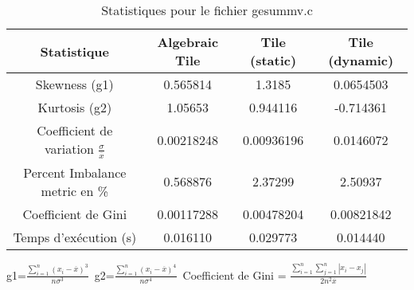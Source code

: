 \documentclass{article}
\begin{document}
\begin{table}[htbp]
  \centering
  \caption{Statistiques pour le fichier gesummv.c}
  \begin{tabular}{|c|c|c|c|}
    \hline
    Statistique & Algebraic Tile & Tile (static) & Tile (dynamic) \\ 
    \hline
    Skewness (g1)  & 0.565814 & 1.3185 & 0.0654503 \\ 
    Kurtosis (g2)  & 1.05653 & 0.944116 & -0.714361 \\ 
    Coefficient de variation $ \frac{\sigma}{\overline{x}} $ & 0.00218248 & 0.00936196 & 0.0146072\\ 
    Percent Imbalance metric en \% & 0.568876 & 2.37299 & 2.50937\\ 
    Coefficient de Gini  & 0.00117288 & 0.00478204 & 0.00821842\\ 
    Temps d'exécution (s) &  0.016110    &  0.029773   &  0.014440   \\ 

    \hline
  \end{tabular}
\end{table}\newline
g1=$ \frac{\sum_{i=1}^{n} (x_i - \overline{x})^3}{n\sigma^3} $\
g2=$ \frac{\sum_{i=1}^{n} (x_i - \overline{x})^4}{n\sigma^4} $\
Coefficient de Gini = $ \frac{\sum_{i=1}^{n}\sum_{j=1}^{n} |x_i - x_j|}{2n^2\overline{x}} $\
\newpage
\end{document}
